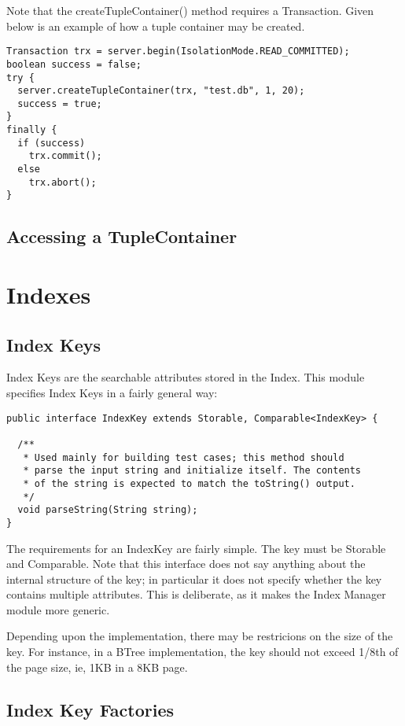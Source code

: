 \documentclass[a4paper,draft,oneside]{book}
\begin{document}
Note that the createTupleContainer() method requires a Transaction.
Given below is an example of how a tuple container may be created.

\begin{verbatim}
Transaction trx = server.begin(IsolationMode.READ_COMMITTED);
boolean success = false;
try {
  server.createTupleContainer(trx, "test.db", 1, 20);
  success = true;
}
finally {
  if (success)
    trx.commit();			
  else 
    trx.abort();
}
\end{verbatim}

\section{Accessing a TupleContainer}


\chapter{Indexes}


\section{Index Keys}

Index Keys are the searchable attributes stored in the Index. This module
specifies Index Keys in a fairly general way:

\begin{verbatim}
public interface IndexKey extends Storable, Comparable<IndexKey> {
	
  /**
   * Used mainly for building test cases; this method should
   * parse the input string and initialize itself. The contents 
   * of the string is expected to match the toString() output.
   */
  void parseString(String string);
}
\end{verbatim}

The requirements for an IndexKey are fairly simple. The key must be
Storable and Comparable. Note that this interface does not say anything
about the internal structure of the key; in particular it does not 
specify whether the key contains multiple attributes. This is deliberate,
as it makes the Index Manager module more generic.

Depending upon the implementation, there may be restricions on the
size of the key. For instance, in a BTree implementation, the key
should not exceed 1/8th of the page size, ie, 1KB in a 8KB page. 

\section{Index Key Factories}
\end{document}
